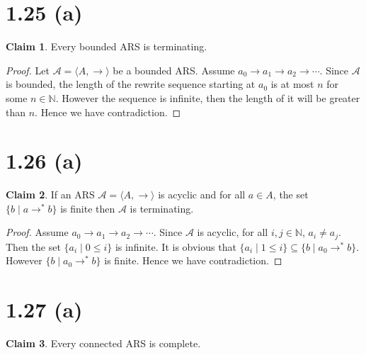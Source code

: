 \documentclass[autodetect-enginem]{article}
\title{}
\author{}
\date{}
\theoremstyle{plain}
\theoremstyle{definition}
\newtheorem*{claim*}{Claim}
\begin{document}
\section*{1.25 (a)}

\begin{claim*}
    Every bounded ARS is terminating.
\end{claim*}

\begin{proof}
    Let $\mathcal{A} = \langle A, \to \rangle$ be a bounded ARS.
    Assume $a_0 \to a_1 \to a_2 \to \cdots$.
    Since $\mathcal{A}$ is bounded, the length of the rewrite sequence starting at $a_0$
    is at most $n$ for some $n \in \mathbb{N}$.
    However the sequence is infinite, then the length of it will be greater than $n$.
    Hence we have contradiction.
\end{proof}

\section*{1.26 (a)}

\begin{claim*}
    If an ARS $\mathcal{A} = \langle A, \to \rangle$ is acyclic and for all $a\in A$, the set $\{b \mid a \to^* b\}$
    is finite then $\mathcal{A}$ is terminating.
\end{claim*}

\begin{proof}
    Assume $a_0 \to a_1 \to a_2 \to \cdots$.
    Since $\mathcal{A}$ is acyclic, for all $i,j \in \mathbb{N}$, $a_i \neq a_j$.
    Then the set $\{ a_i \mid 0 \leq i \}$ is infinite.
    It is obvious that $\{ a_i \mid 1 \leq i \} \subseteq \{b \mid a_0 \to^* b\}$.
    However $\{b \mid a_0 \to^* b\}$ is finite. Hence we have contradiction.
\end{proof}

\section*{1.27 (a)}

\begin{claim*}
    Every connected ARS is complete.
\end{claim*}
\end{document}
